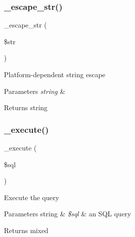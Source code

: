\subsubsection{\texorpdfstring{\+\_\+escape\+\_\+str()}{\_escape\_str()}}
{\footnotesize\ttfamily \+\_\+escape\+\_\+str (\begin{DoxyParamCaption}\item[{}]{\$str }\end{DoxyParamCaption})\hspace{0.3cm}{\ttfamily [protected]}}

Platform-\/dependent string escape


\begin{DoxyParams}{Parameters}
{\em string} & \\
\hline
\end{DoxyParams}
\begin{DoxyReturn}{Returns}
string 
\end{DoxyReturn}
\mbox{\label{class_c_i___d_b__mysql__driver_a114ab675d89bf8324a41785fb475e86d}} 
\subsubsection{\texorpdfstring{\+\_\+execute()}{\_execute()}}
{\footnotesize\ttfamily \+\_\+execute (\begin{DoxyParamCaption}\item[{}]{\$sql }\end{DoxyParamCaption})\hspace{0.3cm}{\ttfamily [protected]}}

Execute the query


\begin{DoxyParams}[1]{Parameters}
string & {\em \$sql} & an S\+QL query \\
\hline
\end{DoxyParams}
\begin{DoxyReturn}{Returns}
mixed 
\end{DoxyReturn}
\mbox{\label{class_c_i___d_b__mysql__driver_aef43f7e3e7b71d337ff3724c5eb14f10}} 
